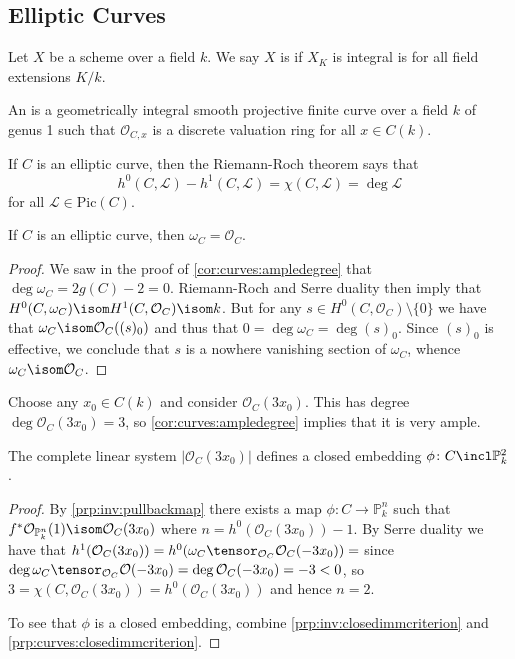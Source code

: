 \documentclass[wip, algebra]{bsteffan-lecturenotes}
\newcommand{\cO}{\mathcal{O}}
\newcommand{\cL}{\mathcal{L}}
\renewcommand{\P}{\mathbb{P}}
\newcommand{\Pic}{\mathrm{Pic}}
\begin{document}
\subsection{Elliptic Curves}
\begin{definition}
	Let $X$ be a scheme over a field $k$.
	We say $X$ is  if $X_K$ is integral is for all field extensions $K / k$.
\end{definition}
\begin{definition}
	An  is a geometrically integral smooth projective finite curve over a field $k$ of genus 1 such that $\cO_{C, x}$ is a discrete valuation ring for all $x \in C(k)$.
\end{definition}
If $C$ is an elliptic curve, then the Riemann-Roch theorem says that
\begin{equation*}
	h^0(C, \cL) - h^1(C, \cL) = \chi(C, \cL) = \deg \cL
\end{equation*}
for all $\cL \in \Pic(C)$.
\begin{proposition}
	If $C$ is an elliptic curve, then $\omega_C = \cO_C$.
\end{proposition}
\begin{proof}
	We saw in the proof of \cref{cor:curves:ampledegree} that $\deg \omega_C = 2g(C) - 2 = 0$.
	Riemann-Roch and Serre duality then imply that $H^0(C, \omega_C) \isom H^1(C, \cO_C) \isom k$.
	But for any $s \in H^0(C, \cO_C) \setminus \{0\}$ we have that $\omega_C \isom \cO_C((s)_0)$ and thus that $0 = \deg \omega_C = \deg (s)_0$.
	Since $(s)_0$ is effective, we conclude that $s$ is a nowhere vanishing section of $\omega_C$, whence $\omega_C \isom \cO_C$.
\end{proof}
Choose any $x_0 \in C(k)$ and consider $\cO_C(3x_0)$.
This has degree $\deg \cO_C(3x_0) = 3$, so \cref{cor:curves:ampledegree} implies that it is very ample.
\begin{proposition}
	The complete linear system $|\cO_C(3x_0)|$ defines a closed embedding $\phi\colon C \incl \P^2_k$.
\end{proposition}
\begin{proof}
	By \cref{prp:inv:pullbackmap} there exists a map $\phi\colon C \to \P^n_k$ such that $f^* \cO_{\P^n_k}(1) \isom \cO_C(3x_0)$ where $n = h^0(\cO_C(3x_0)) - 1$.
	By Serre duality we have that $h^1(\cO_C(3x_0)) = h^0(\omega_C \tensor_{\cO_C} \cO_C(-3x_0)) = $ since $\deg \omega_C \tensor_{\cO_C} \cO(-3x_0) = \deg \cO_C(-3x_0) = -3 < 0$, so $3 = \chi(C, \cO_C(3x_0)) = h^0(\cO_C(3x_0))$ and hence $n = 2$.

	To see that $\phi$ is a closed embedding, combine \cref{prp:inv:closedimmcriterion} and \cref{prp:curves:closedimmcriterion}.
\end{proof}
\end{document}
